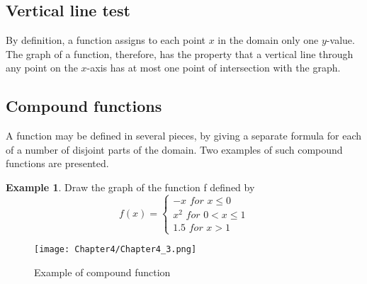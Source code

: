 \documentclass[10pt,a4paper]{book}
\theoremstyle{definition}\newtheorem{definition}{Definition}
\theoremstyle{definition}\newtheorem{fact}{Fact}
\theoremstyle{definition}\newtheorem{ex}{Ex.}
\theoremstyle{definition}\newtheorem{project}{Project}
\theoremstyle{definition}\newtheorem{problem}{Problem}
\theoremstyle{definition}\newtheorem{example}{Example}
\numberwithin{theorem}{chapter}
\numberwithin{corollary}{chapter}
\numberwithin{assumption}{chapter}
\numberwithin{definition}{chapter}
\numberwithin{prop}{chapter}
\numberwithin{notation}{chapter}
\numberwithin{problem}{chapter}
\numberwithin{example}{chapter}
\numberwithin{fact}{chapter}
\numberwithin{ex}{chapter}
\begin{document}
	\subsection{Vertical line test}
	By definition, a function assigns to each point $x$ in the domain only one $y$-value. The graph of a function, therefore, has the property that a vertical line through any point on the $x$-axis has at most one point of intersection with the graph.
	
	\pagebreak
	
	\subsection{Compound functions}
	A function may be defined in several pieces, by giving a separate formula for each of a number of disjoint parts of the domain. Two examples of such compound functions are presented.
	
	\begin{example}
		Draw the graph of the function f defined by
		$$
		f(x)=
		\begin{cases}
			-x \,\, for \,\, x \leq 0      \\
			x^2 \,\, for \,\, 0 < x \leq 1 \\
			1.5 \,\, for \,\, x>1          
		\end{cases}
		$$
		\begin{figure}[ht]
			\centering
			\texttt{[image: Chapter4/Chapter4\_3.png]}
			\caption{Example of compound function}
		\end{figure}
	\end{example}
	
\end{document}
